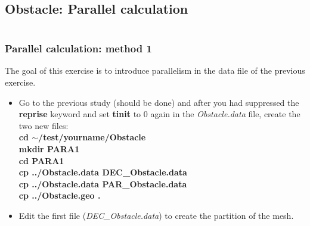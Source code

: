 \documentclass[10pt]{beamer}
\begin{document}



\subsection{Obstacle: Parallel calculation}
\begin{frame}
\begin{columns}[c] 
\tableofcontents[sections={1-6},currentsection, currentsubsection]
\tableofcontents[sections={7-12},currentsection, currentsubsection]
\end{columns}
\end{frame}
\begin{frame}
\frametitle{Parallel calculation: method 1}
\begin{block}{}

The goal of this exercise is to introduce parallelism in the data file of the previous exercise.

\begin{itemize}
\item Go to the previous study (should be done) and after you had suppressed the \textbf{reprise} keyword and set \textbf{tinit} to 0 again in the \textit{Obstacle.data} file, create the two new files:\\
\textbf{cd $\sim$/test/yourname/Obstacle} \\
\textbf{mkdir PARA1} \\
\textbf{cd PARA1} \\
\textbf{cp ../Obstacle.data DEC\_Obstacle.data} \\
\textbf{cp ../Obstacle.data PAR\_Obstacle.data} \\
\textbf{cp ../Obstacle.geo .}\\
\vspace{0.3cm}
\item Edit the first file (\textit{DEC\_Obstacle.data}) to create the partition of the mesh.
\end{itemize}

\end{block}
\end{frame}
\end{document}
